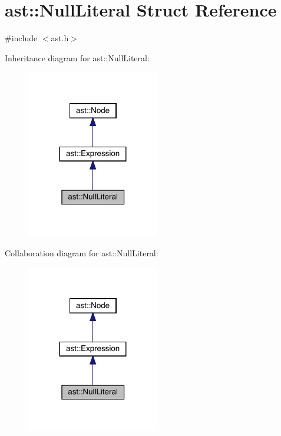 \hypertarget{structast_1_1_null_literal}{}\section{ast\+:\+:Null\+Literal Struct Reference}
\label{structast_1_1_null_literal}


{\ttfamily \#include $<$ast.\+h$>$}



Inheritance diagram for ast\+:\+:Null\+Literal\+:
\nopagebreak
\begin{figure}[H]
\begin{center}
\leavevmode
\includegraphics[width=164pt]{structast_1_1_null_literal__inherit__graph}
\end{center}
\end{figure}


Collaboration diagram for ast\+:\+:Null\+Literal\+:
\nopagebreak
\begin{figure}[H]
\begin{center}
\leavevmode
\includegraphics[width=164pt]{structast_1_1_null_literal__coll__graph}
\end{center}
\end{figure}
